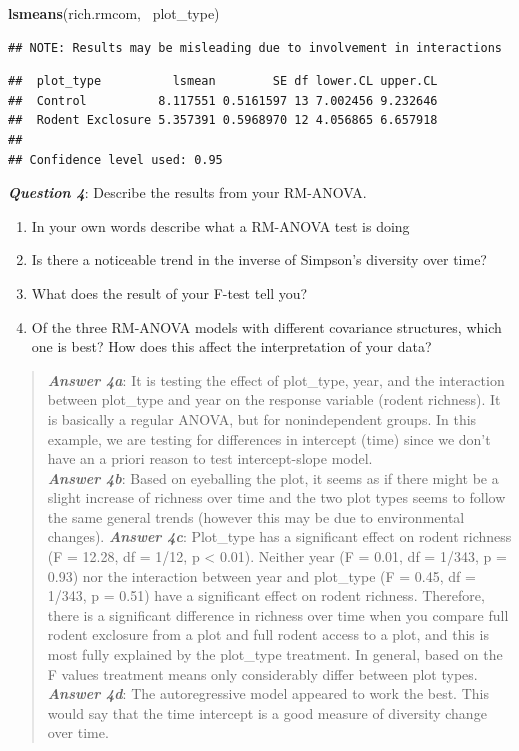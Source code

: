\documentclass[]{article}
\newenvironment{Shaded}{\begin{snugshade}}{\end{snugshade}}
\newcommand{\KeywordTok}[1]{\textcolor[rgb]{0.13,0.29,0.53}{\textbf{{#1}}}}
\newcommand{\NormalTok}[1]{{#1}}
\providecommand{\tightlist}{%
  \setlength{\itemsep}{0pt}\setlength{\parskip}{0pt}}
\begin{document}
\begin{Shaded}
\begin{Highlighting}[]
\KeywordTok{lsmeans}\NormalTok{(rich.rmcom, ~plot_type)}
\end{Highlighting}
\end{Shaded}

\begin{verbatim}
## NOTE: Results may be misleading due to involvement in interactions
\end{verbatim}

\begin{verbatim}
##  plot_type          lsmean        SE df lower.CL upper.CL
##  Control          8.117551 0.5161597 13 7.002456 9.232646
##  Rodent Exclosure 5.357391 0.5968970 12 4.056865 6.657918
## 
## Confidence level used: 0.95
\end{verbatim}

\textbf{\emph{Question 4}}: Describe the results from your RM-ANOVA.

\begin{enumerate}
\def\labelenumi{\alph{enumi}.}
\tightlist
\item
  In your own words describe what a RM-ANOVA test is doing
\item
  Is there a noticeable trend in the inverse of Simpson's diversity over
  time?
\item
  What does the result of your F-test tell you?
\item
  Of the three RM-ANOVA models with different covariance structures,
  which one is best? How does this affect the interpretation of your
  data?
\end{enumerate}

\begin{quote}
\textbf{\emph{Answer 4a}}: It is testing the effect of plot\_type, year,
and the interaction between plot\_type and year on the response variable
(rodent richness). It is basically a regular ANOVA, but for
nonindependent groups. In this example, we are testing for differences
in intercept (time) since we don't have an a priori reason to test
intercept-slope model.\\
\textbf{\emph{Answer 4b}}: Based on eyeballing the plot, it seems as if
there might be a slight increase of richness over time and the two plot
types seems to follow the same general trends (however this may be due
to environmental changes). \textbf{\emph{Answer 4c}}: Plot\_type has a
significant effect on rodent richness (F = 12.28, df = 1/12, p
\textless{} 0.01). Neither year (F = 0.01, df = 1/343, p = 0.93) nor the
interaction between year and plot\_type (F = 0.45, df = 1/343, p = 0.51)
have a significant effect on rodent richness. Therefore, there is a
significant difference in richness over time when you compare full
rodent exclosure from a plot and full rodent access to a plot, and this
is most fully explained by the plot\_type treatment. In general, based
on the F values treatment means only considerably differ between plot
types. \textbf{\emph{Answer 4d}}: The autoregressive model appeared to
work the best. This would say that the time intercept is a good measure
of diversity change over time.
\end{quote}
\end{document}
